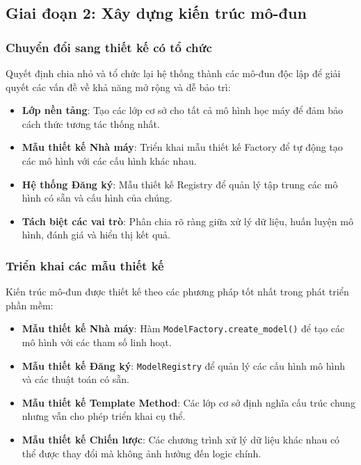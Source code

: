 \subsection{Giai đoạn 2: Xây dựng kiến trúc mô-đun}\label{subsec:modular-stage}

\subsubsection{Chuyển đổi sang thiết kế có tổ chức}

Quyết định chia nhỏ và tổ chức lại hệ thống thành các mô-đun độc lập để giải quyết các vấn đề về khả năng mở rộng và dễ bảo trì:

\begin{itemize}
    \item \textbf{Lớp nền tảng}: Tạo các lớp cơ sở cho tất cả mô hình học máy để đảm bảo cách thức tương tác thống nhất.
    \item \textbf{Mẫu thiết kế Nhà máy}: Triển khai mẫu thiết kế Factory để tự động tạo các mô hình với các cấu hình khác nhau.
    \item \textbf{Hệ thống Đăng ký}: Mẫu thiết kế Registry để quản lý tập trung các mô hình có sẵn và cấu hình của chúng.
    \item \textbf{Tách biệt các vai trò}: Phân chia rõ ràng giữa xử lý dữ liệu, huấn luyện mô hình, đánh giá và hiển thị kết quả.
\end{itemize}

\subsubsection{Triển khai các mẫu thiết kế}

Kiến trúc mô-đun được thiết kế theo các phương pháp tốt nhất trong phát triển phần mềm:

\begin{itemize}
    \item \textbf{Mẫu thiết kế Nhà máy}: Hàm \texttt{ModelFactory.create\_model()} để tạo các mô hình với các tham số linh hoạt.
    \item \textbf{Mẫu thiết kế Đăng ký}: \texttt{ModelRegistry} để quản lý các cấu hình mô hình và các thuật toán có sẵn.
    \item \textbf{Mẫu thiết kế Template Method}: Các lớp cơ sở định nghĩa cấu trúc chung nhưng vẫn cho phép triển khai cụ thể.
    \item \textbf{Mẫu thiết kế Chiến lược}: Các chương trình xử lý dữ liệu khác nhau có thể được thay đổi mà không ảnh hưởng đến logic chính.
\end{itemize}

